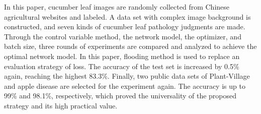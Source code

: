 \documentclass[a4paper,fleqn]{cas-sc}
\begin{document}
In this paper, cucumber leaf images are randomly collected from Chinese agricultural websites and labeled. A data set with complex image background is constructed, and seven kinds of cucumber leaf pathology judgments are made. Through the control variable method, the network model, the optimizer, and batch size, three rounds of experiments are compared and analyzed to achieve the optimal network model. In this paper, flooding method is used to replace an evaluation strategy of loss. The accuracy of the test set is increased by 0.5\% again, reaching the highest 83.3\%. Finally, two public data sets of Plant-Village and apple disease are selected for the experiment again. The accuracy is up to 99\% and 98.1\%, respectively, which proved the universality of the proposed strategy and its high practical value.

%

 
\end{document}
